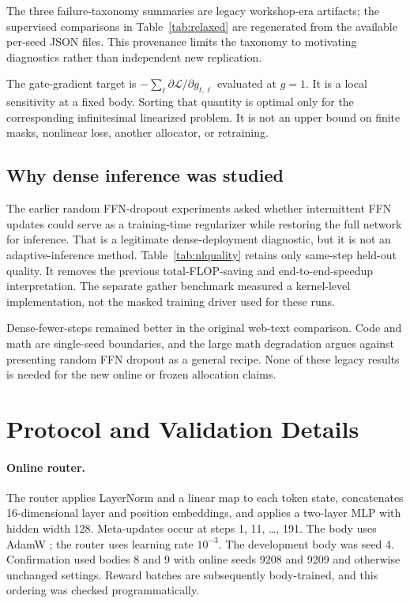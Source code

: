 \documentclass{article}
\begin{document}
The three failure-taxonomy summaries are legacy workshop-era artifacts; the
supervised comparisons in Table~\ref{tab:relaxed} are regenerated from the
available per-seed JSON files. This provenance limits the taxonomy to
motivating diagnostics rather than independent new replication.

The gate-gradient target is
$-\sum_\ell \partial\mathcal L/\partial g_{t,\ell}$ evaluated at $g=1$.
It is a local sensitivity at a fixed body. Sorting that quantity is optimal
only for the corresponding infinitesimal linearized problem. It is not an
upper bound on finite masks, nonlinear loss, another allocator, or retraining.

\subsection{Why dense inference was studied}
The earlier random FFN-dropout experiments asked whether intermittent FFN
updates could serve as a training-time regularizer while restoring the full
network for inference. That is a legitimate dense-deployment diagnostic, but
it is not an adaptive-inference method. Table~\ref{tab:nlquality} retains only
same-step held-out quality. It removes the previous total-FLOP-saving and
end-to-end-speedup interpretation. The separate gather benchmark measured a
kernel-level implementation, not the masked training driver used for these
runs.

\begin{table}[h]
\centering
\caption{Original Pythia-1.4B fine-tuning quality under dense inference.
Rotation is random token-level FFN dropout during training. Cells list
per-seed values. These are same-step quality comparisons, not matched-total-cost
or sparse-deployment efficiency results.}
\label{tab:nlquality}
\nlqualitytable
\end{table}

Dense-fewer-steps remained better in the original web-text comparison. Code
and math are single-seed boundaries, and the large math degradation argues
against presenting random FFN dropout as a general recipe. None of these
legacy results is needed for the new online or frozen allocation claims.

\section{Protocol and Validation Details}
\label{app:validation}

\paragraph{Online router.}
The router applies LayerNorm and a linear map to each token state, concatenates
16-dimensional layer and position embeddings, and applies a two-layer MLP with
hidden width 128. Meta-updates occur at steps 1, 11, \ldots, 191. The body uses
AdamW \citep{loshchilov2019decoupled}; the router uses learning rate $10^{-3}$.
The development body was seed 4. Confirmation used bodies 8 and 9 with online
seeds 9208 and 9209 and otherwise unchanged settings. Reward batches are
subsequently body-trained, and this ordering was checked programmatically.
\end{document}
